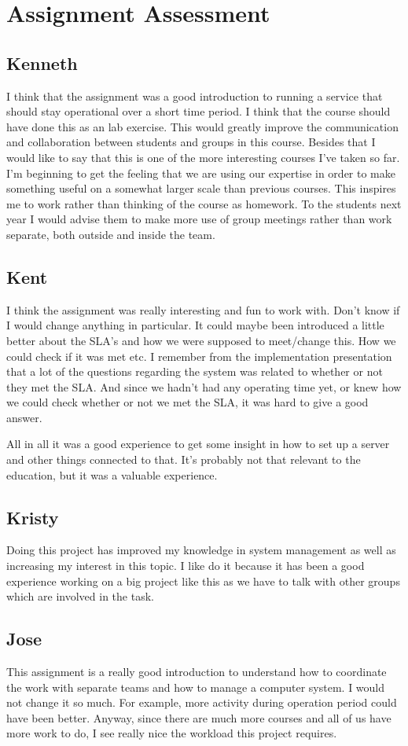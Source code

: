 \section{Assignment Assessment}
\subsection{Kenneth}
I think that the assignment was a good introduction to running a service that should stay operational over a short time period. I think that the course should have done this as an lab exercise. This would greatly improve the communication and collaboration between students and groups in this course. Besides that I would like to say that this is one of the more interesting courses I’ve taken so far. I’m beginning to get the feeling that we are using our expertise in order to make something useful on a somewhat larger scale than previous courses. This inspires me to work rather than thinking of the course as homework. To the students next year I would advise them to make more use of group meetings rather than work separate, both outside and inside the team.
\subsection{Kent}
I think the assignment was really interesting and fun to work with. Don’t know if I would change anything in particular. It could maybe been introduced a little better about the SLA’s and how we were supposed to meet/change this. How we could check if it was met etc. I remember from the implementation presentation that a lot of the questions regarding the system was related to whether or not they met the SLA. And since we hadn’t had any operating time yet, or knew how we could check whether or not we met the SLA, it was hard to give a good answer. 

All in all it was a good experience to get some insight in how to set up a server and other things connected to that. It’s probably not that relevant to the education, but it was a valuable experience. 
\subsection{Kristy}
Doing this project has improved my knowledge in system management as well as increasing my interest in this topic. 
I like do it because it has been a good experience working on a big project like this as we have to talk with other groups which are involved in the task. 
\subsection{Jose}
This assignment is a really good introduction to understand how to coordinate the work with separate teams and how to manage a computer system. I would not change it so much. For example, more activity during operation period could have been better. Anyway, since there are much more courses and all of us have more work to do, I see really nice the workload this project requires.
